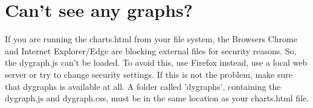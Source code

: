 \documentclass[8pt]{extarticle}
\begin{document}
\section*{Can't see any graphs?}
If you are running the charts.html from your file system, the Browsers Chrome and Internet Explorer/Edge are blocking external files for security reasons. So, the dygraph.js can't be loaded. To avoid this, use Firefox instead, use a local web server or try to change security settings.
If this is not the problem, make sure that dygraphs is available at all. A folder called 'dygraphs', containing the dygraph.js and dygraph.css, must be in the same location as your charts.html file.
\end{document}
